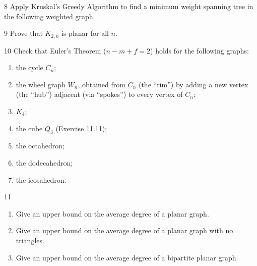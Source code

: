\begin{exercise}{8}
    Apply Kruskal's Greedy Algorithm to find a minimum weight spanning tree in the
    following weighted graph.
    \begin{center}
    \end{center}
\end{exercise}

\begin{exercise}{9}
    Prove that $K_{2,n}$ is planar for all $n$.
\end{exercise}

\begin{exercise}{10}
    Check that Euler's Theorem ($n-m+f=2$) holds for the following graphs:
    \begin{enumerate}[label=(\alph*)]
        \item the cycle $C_n$;
        \item the wheel graph $W_n$, obtained from $C_n$ (the ``rim'') by adding
              a new vertex (the ``hub'') adjacent (via ``spokes'') to every vertex
              of $C_n$;
        \item $K_4$;
        \item the cube $Q_3$ (Exercise 11.11);
        \item the octahedron;
        \item the dodecahedron;
        \item the icosahedron.
    \end{enumerate}
\end{exercise}

\begin{exercise}{11}
    \begin{enumerate}[label=(\alph*)]
        \item Give an upper bound on the average degree of a planar graph.
        \item Give an upper bound on the average degree of a planar graph with no
              triangles.
        \item Give an upper bound on the average degree of a bipartite planar
              graph.
    \end{enumerate}
\end{exercise}


